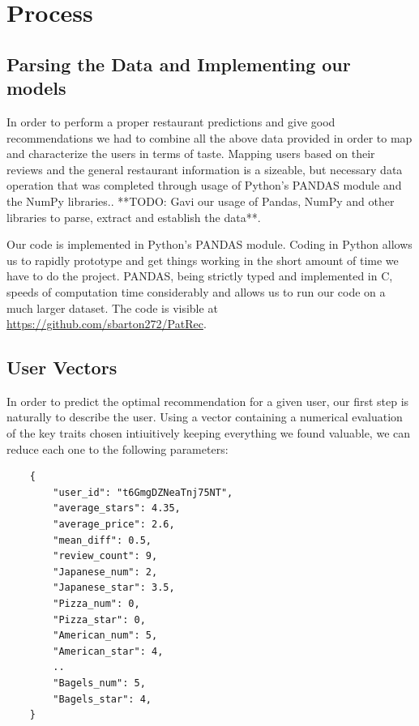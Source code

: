 \documentclass[10pt,twocolumn,letterpaper]{article}
\begin{document}
\section{Process}

\subsection{Parsing the Data and Implementing our models}
In order to perform a proper restaurant predictions and give good recommendations we had to combine all the above data provided in order to map and characterize the users in terms of taste. Mapping users based on their reviews and the general restaurant information is a sizeable, but necessary data operation that was completed through usage of Python's PANDAS module and the NumPy libraries.. **TODO: Gavi our usage of Pandas, NumPy and other libraries to parse, extract and establish the data**.

Our code is implemented in Python's PANDAS module. Coding in Python allows us to rapidly prototype and get things working in the short amount of time we have to do the project. PANDAS, being strictly typed and implemented in C, speeds of computation time considerably and allows us to run our code on a much larger dataset. The code is visible at \url{https://github.com/sbarton272/PatRec}.

\subsection{User Vectors}
In order to predict the optimal recommendation for a given user, our first step is naturally to describe the user. Using a vector containing a numerical evaluation of the key traits chosen intiuitively keeping everything we found valuable, we can reduce each one to the following parameters:
\begin{verbatim}
	{
	    "user_id": "t6GmgDZNeaTnj75NT",
	    "average_stars": 4.35,
	    "average_price": 2.6,
	   	"mean_diff": 0.5,
	   	"review_count": 9,
	   	"Japanese_num": 2,
	   	"Japanese_star": 3.5,
	   	"Pizza_num": 0,
	   	"Pizza_star": 0,
	   	"American_num": 5,
	   	"American_star": 4,
	   	..
	   	"Bagels_num": 5,
	   	"Bagels_star": 4,
	}
\end{verbatim}
\end{document}
